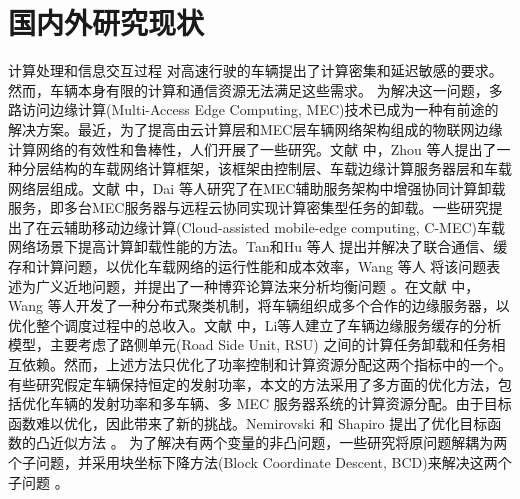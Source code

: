 \section{国内外研究现状}\label{section1-2}
计算处理和信息交互过程 对高速行驶的车辆提出了计算密集和延迟敏感的要求。然而，车辆本身有限的计算和通信资源无法满足这些需求。
为解决这一问题，多路访问边缘计算(Multi-Access Edge Computing, MEC)技术已成为一种有前途的解决方案。最近，为了提高由云计算层和MEC层车辆网络架构组成的物联网边缘计算网络的有效性和鲁棒性，人们开展了一些研究。文献 \cite{Zhou2019}中，Zhou 等人提出了一种分层结构的车载网络计算框架，该框架由控制层、车载边缘计算服务器层和车载网络层组成。文献 \cite{Dai2022}中，Dai 等人研究了在MEC辅助服务架构中增强协同计算卸载服务，即多台MEC服务器与远程云协同实现计算密集型任务的卸载。一些研究提出了在云辅助移动边缘计算(Cloud-assisted mobile-edge computing, C-MEC)车载网络场景下提高计算卸载性能的方法。Tan和Hu 等人 \supercite{Tan2018}提出并解决了联合通信、缓存和计算问题，以优化车载网络的运行性能和成本效率，Wang 等人 将该问题表述为广义近地问题，并提出了一种博弈论算法来分析均衡问题 \supercite{Wang2020}。在文献 \cite{Wang2022}中， Wang 等人开发了一种分布式聚类机制，将车辆组织成多个合作的边缘服务器，以优化整个调度过程中的总收入。文献 \cite{Li2023}中，Li等人建立了车辆边缘服务缓存的分析模型，主要考虑了路侧单元(Road Side Unit, RSU) 之间的计算任务卸载和任务相互依赖。然而，上述方法只优化了功率控制和计算资源分配这两个指标中的一个。有些研究假定车辆保持恒定的发射功率，本文的方法采用了多方面的优化方法，包括优化车辆的发射功率和多车辆、多 MEC 服务器系统的计算资源分配。由于目标函数难以优化，因此带来了新的挑战。Nemirovski 和 Shapiro 提出了优化目标函数的凸近似方法 \supercite{Nemirovski2007}。 为了解决有两个变量的非凸问题，一些研究将原问题解耦为两个子问题，并采用块坐标下降方法(Block Coordinate Descent, BCD)来解决这两个子问题 \supercite{bertsekas1999nonlinear}。
